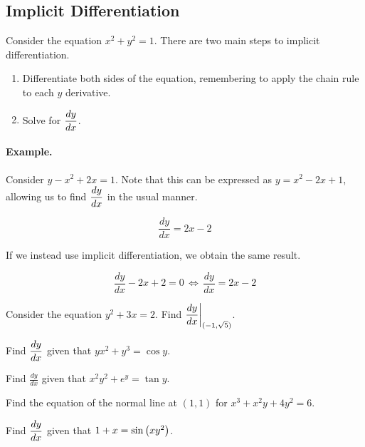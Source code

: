 \documentclass[12pt]{article}
\begin{document}
\newpage

\subsection*{Implicit Differentiation}

Consider the equation $x^2+y^2=1$. There are two main steps to implicit differentiation.

\begin{enumerate}
	\item[\tc{1}] Differentiate both sides of the equation, remembering to apply the chain rule to each $y$ derivative.
	\vspace{30mm}
	\item[\tc{2}] Solve for $\displaystyle\frac{dy}{dx}$.
	\vspace{30mm}
\end{enumerate}

\paragraph{Example.} Consider $y-x^2+2x=1$. Note that this can be expressed as $y=x^2-2x+1$, allowing us to find $\displaystyle\frac{dy}{dx}$ in the usual manner.

$$\frac{dy}{dx}=2x-2$$

\vspace{3mm}

If we instead use implicit differentiation, we obtain the same result.

$$\frac{dy}{dx}-2x+2=0 \,\Longleftrightarrow\,\frac{dy}{dx}=2x-2$$

\vspace{3mm}

\Example Consider the equation $y^2+3x=2$. Find $\displaystyle\frac{dy}{dx}\bigg|_{(-1,\sqrt{5})}$.

\newpage

\Example Find $\displaystyle\frac{dy}{dx}$ given that $yx^2+y^3=\cos y$. 

\vspace{60mm}

\Example Find $\frac{dy}{dx}$ given that $x^2y^2+e^y=\tan y$.

\vspace{60mm}

\Example Find the equation of the normal line at $(1,1)$ for $x^3+x^2y+4y^2=6$.

\newpage

\Example Find $\displaystyle\frac{dy}{dx}$ given that $1+x=\sin\left( xy^2\right)$.
\end{document}
